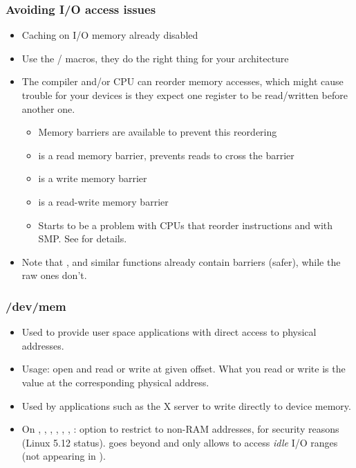 \begin{frame}
  \frametitle{Avoiding I/O access issues}
  \begin{itemize}
  \item Caching on I/O memory already disabled
  \item Use the / macros,
        they do the right thing for your architecture
  \item The compiler and/or CPU can reorder memory accesses, which
    might cause trouble for your devices is they expect one register
    to be read/written before another one.
    \begin{itemize}
    \item Memory barriers are available to prevent this reordering
    \item {} is a read memory barrier, prevents reads to
      cross the barrier
    \item {} is a write memory barrier
    \item {} is a read-write memory barrier
    \item Starts to be a problem with CPUs that reorder instructions and
          with SMP. See  for details.
    \end{itemize}
  \item Note that ,  and similar functions
        already contain barriers (safer), while the raw ones don't.
  \end{itemize}
\end{frame}

\begin{frame}
  \frametitle{/dev/mem}
  \begin{itemize}
  \item Used to provide user space applications with direct access to
    physical addresses.
  \item Usage: open  and read or write at given offset.
    What you read or write is the value at the corresponding physical
    address.
  \item Used by applications such as the X server to write directly to
    device memory.
  \item On , , , ,
    , , :
     option to restrict 
    to non-RAM addresses, for security reasons (Linux 5.12 status).
     goes beyond and only allows to access
    {\em idle} I/O ranges (not appearing in ).
\end{itemize}
\end{frame}
